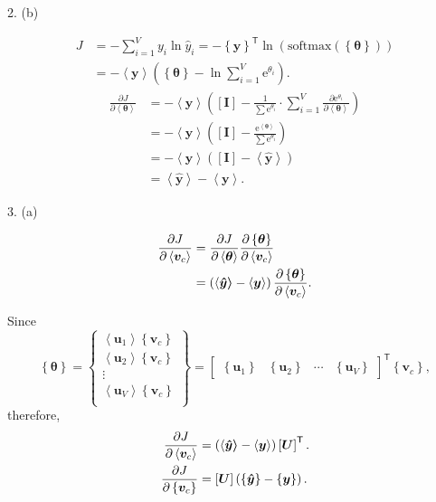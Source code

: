\documentclass[twoside]{article}
\begin{document}
	2. (b)
	
	\begin{align*}
		J &= -\sum_{i=1}^{V}y_i \ln\hat{y}_i = -\left\{\bm{y}\right\}^\mathsf{T}\ln(\mathrm{softmax}(\left\{\bm{\theta}\right\}))\\
		&= -\left<\bm{y}\right>\left(\left\{\bm{\theta}\right\}-\ln\sum_{i=1}^{V}\mathrm{e}^{\theta_i}\right).
	\end{align*}
	\begin{align*}
		\frac{\partial J}{\partial\left<\bm{\theta}\right>} &= -\left<\bm{y}\right>\left(\left[\bm{I}\right]-\frac{1}{\sum\mathrm{e}^{\theta_i}}\cdot\sum_{i=1}^{V}\frac{\partial\mathrm{e}^{\theta_i}}{\partial\left<\bm{\theta}\right>}\right)\\
		&= -\left<\bm{y}\right>\left(\left[\bm{I}\right]-\frac{\mathrm{e}^{\left<\bm{\theta}\right>}}{\sum\mathrm{e}^{\theta_i}}\right)\\
		&= -\left<\bm{y}\right>\left(\left[\bm{I}\right]-\left<\bm{\hat{y}}\right>\right)\\
		&= \left<\bm{\hat{y}}\right> - \left<\bm{y}\right>.
	\end{align*}
	
	3. (a)
	
	\begin{align*}
		\frac{\partial J}{\partial\left<\bm{v}_c\right>} &= \frac{\partial J}{\partial\left<\bm{\theta}\right>}\frac{\partial\left\{\bm{\theta}\right\}}{\partial\left<\bm{v}_c\right>}\\
		&=\left(\left<\bm{\hat{y}\right>}-\left<\bm{y}\right>\right)\frac{\partial\left\{\bm{\theta}\right\}}{\partial\left<\bm{v}_c\right>}.
	\end{align*}
	
	Since
	\begin{equation*}
		\left\{\bm{\theta}\right\} = \left\{
		\begin{matrix}
		\left<\bm{u}_1\right>\left\{\bm{v}_c\right\}\\
		\left<\bm{u}_2\right>\left\{\bm{v}_c\right\}\\
		\vdots\\
		\left<\bm{u}_V\right>\left\{\bm{v}_c\right\}\\
		\end{matrix}\right\} = \left[
		\begin{matrix}
		\left\{\bm{u}_1\right\} & \left\{\bm{u}_2\right\} & \cdots & \left\{\bm{u}_V\right\}
		\end{matrix}\right]^\mathsf{T}\left\{\bm{v}_c\right\},
	\end{equation*}
	\noindent therefore,
	\begin{align*}
		\frac{\partial J}{\partial\left<\bm{v}_c\right>} &= \left(\left<\bm{\hat{y}\right>}-\left<\bm{y}\right>\right)\left[\bm{U}\right]^\mathsf{T}.\\
		\frac{\partial J}{\partial\left\{\bm{v}_c\right\}} &= \left[\bm{U}\right]\left(\left\{\bm{\hat{y}}\right\} - \left\{\bm{y}\right\}\right).
	\end{align*}
	
\end{document}
